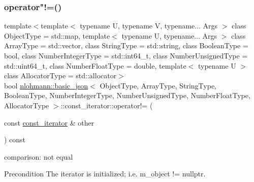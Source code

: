 \subsubsection{\texorpdfstring{operator"!=()}{operator!=()}}
{\footnotesize\ttfamily template$<$template$<$ typename U, typename V, typename... Args $>$ class Object\+Type = std\+::map, template$<$ typename U, typename... Args $>$ class Array\+Type = std\+::vector, class String\+Type  = std\+::string, class Boolean\+Type  = bool, class Number\+Integer\+Type  = std\+::int64\+\_\+t, class Number\+Unsigned\+Type  = std\+::uint64\+\_\+t, class Number\+Float\+Type  = double, template$<$ typename U $>$ class Allocator\+Type = std\+::allocator$>$ \\
bool \hyperlink{classnlohmann_1_1basic__json}{nlohmann\+::basic\+\_\+json}$<$ Object\+Type, Array\+Type, String\+Type, Boolean\+Type, Number\+Integer\+Type, Number\+Unsigned\+Type, Number\+Float\+Type, Allocator\+Type $>$\+::const\+\_\+iterator\+::operator!= (\begin{DoxyParamCaption}\item[{const \hyperlink{classnlohmann_1_1basic__json_1_1const__iterator}{const\+\_\+iterator} \&}]{other }\end{DoxyParamCaption}) const\hspace{0.3cm}{\ttfamily [inline]}}



comparison\+: not equal 

\begin{DoxyPrecond}{Precondition}
The iterator is initialized; i.\+e. {\ttfamily m\+\_\+object != nullptr}. 
\end{DoxyPrecond}
\hypertarget{classnlohmann_1_1basic__json_1_1const__iterator_acfc918b6350449111ca58af5eb3da999}{}\label{classnlohmann_1_1basic__json_1_1const__iterator_acfc918b6350449111ca58af5eb3da999} 
